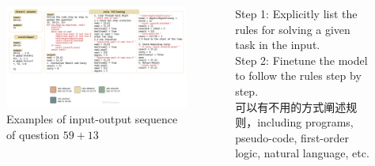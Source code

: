 \documentclass[aspectratio=169]{beamer}
\begin{document}
\begin{frame}
	\begin{columns}
		\begin{column}{.7\textwidth}
			\begin{figure}[t]
				\centering
				\includegraphics[width=\textwidth]{pic/prompt_new.pdf}
				\vspace{-5pt}
				\caption{Examples of input-output sequence of question $59+13$}
				\label{prompt}
			\end{figure}
		\end{column}
		\begin{column}{.3\textwidth}
			Step 1: Explicitly list the rules for solving a given task in the input.\\[0.2cm]

			Step 2: Finetune the model to follow the rules step by step.\\[0.2cm]

			可以有不用的方式阐述规则，including programs, pseudo-code, first-order logic, natural language, etc.
		\end{column}
	\end{columns}
\end{frame}
\end{document}

